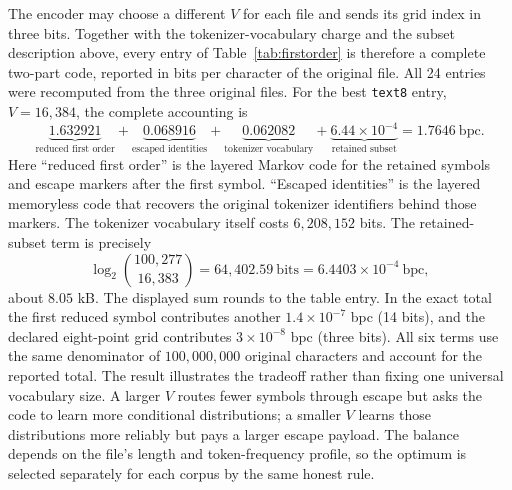 \documentclass[11pt]{article}
\begin{document}
The encoder may choose a different $V$ for each file and sends its grid index
in three bits.  Together with the tokenizer-vocabulary charge and the subset
description above, every entry of Table~\ref{tab:firstorder} is therefore a
complete two-part code, reported in bits per character of the original file.
All 24 entries were recomputed from the three original files.  For the best
\texttt{text8} entry, $V=16{,}384$, the complete accounting is
\[
 \underbrace{1.632921}_{\text{reduced first order}}
 +\underbrace{0.068916}_{\text{escaped identities}}
 +\underbrace{0.062082}_{\text{tokenizer vocabulary}}
 +\underbrace{6.44\mathbin{\times}10^{-4}}_{\text{retained subset}}
 =1.7646\ \text{bpc}.
\]
Here ``reduced first order'' is the layered Markov code for the retained
symbols and escape markers after the first symbol.  ``Escaped identities'' is
the layered memoryless code that recovers the original tokenizer identifiers
behind those markers.  The tokenizer vocabulary itself costs $6{,}208{,}152$
bits.  The retained-subset term is precisely
\[
 \log_2\binom{100{,}277}{16{,}383}
 =64{,}402.59\ \text{bits}=6.4403\mathbin{\times}10^{-4}\ \text{bpc},
\]
about $8.05$ kB.  The displayed sum rounds to the table entry.  In the exact
total the first reduced symbol contributes another $1.4\mathbin{\times}10^{-7}$
bpc (14 bits), and the declared eight-point grid contributes
$3\mathbin{\times}10^{-8}$ bpc (three bits).  All six terms use the same
denominator of $100{,}000{,}000$ original characters and account for the
reported total.  The result illustrates the
tradeoff rather than fixing one universal vocabulary size.  A larger $V$
routes fewer symbols through escape but asks the code to learn more
conditional distributions; a smaller $V$ learns those distributions more
reliably but pays a larger escape payload.  The balance depends on the file's
length and token-frequency profile, so the optimum is selected separately for
each corpus by the same honest rule.
\end{document}
